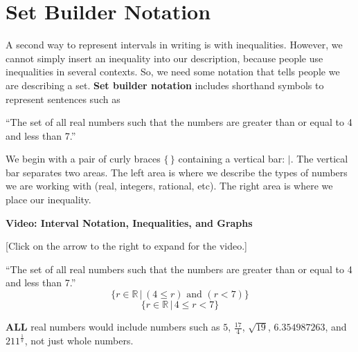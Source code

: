\documentclass{ximera}
\begin{document}
\section{Set Builder Notation}

A second way to represent intervals in writing is with inequalities. However, we cannot simply insert an inequality into our description, because people use inequalities in several contexts.  So, we need some notation that tells people we are describing a set. \textbf{Set builder notation} includes shorthand symbols to represent sentences such as 

\begin{center}
``The set of all real numbers such that the numbers are greater than or equal to 4 and less than 7.''
\end{center}

We begin with a pair of curly braces $\{  \, \}$ containing a vertical bar:  ${|}$.  The vertical bar separates two areas. The left area is where we describe the types of numbers we are working with (real, integers, rational, etc).  The right area is where we place our inequality.





\begin{explanation} \textbf{Video: Interval Notation, Inequalities, and Graphs}

[Click on the arrow to the right to expand for the video.]
\begin{expandable} 

\begin{center}
\end{center}

\end{expandable}
\end{explanation}





\begin{example}
``The set of all real numbers such that the numbers are greater than or equal to 4 and less than 7.''
\[ \{ r \in \mathbb {R} \, | \, (4 \leq r)  \text{ and } (r < 7) \} \]
\[ \{ r \in \mathbb {R} \, | \, 4 \leq r < 7 \} \]

\begin{explanation}
\textbf{ALL} real numbers would include numbers such as $5$, $\frac{17}{4}$, $\sqrt{19}$, $6.354987263$, and $211^{\tfrac{1}{\pi}}$, not just whole numbers.
\end{explanation}
\end{example}
\end{document}
